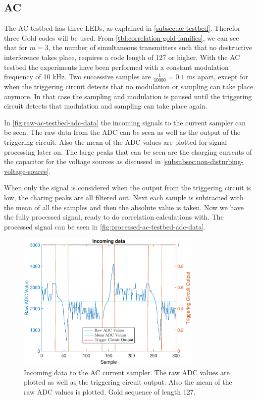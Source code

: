 
\subsection{AC}


The AC testbed has three LEDs, as explained in \autoref{subsec:ac-testbed}.
Therefor three Gold codes will be used.
From \autoref{tbl:correlation-gold-families}, we can see that for $m = 3$, the number of simultaneous transmitters such that no destructive interference takes place, requires a code length of 127 or higher.
With the AC testbed the experiments have been performed with a constant modulation frequency of 10 kHz.
Two successive samples are $\frac{1}{10000} = 0.1$ ms apart, except for when the triggering circuit detects that no modulation or sampling can take place anymore.
In that case the sampling and modulation is paused until the triggering circuit detects that modulation and sampling can take place again.


In \autoref{fig:raw-ac-testbed-adc-data} the incoming signals to the current sampler can be seen.
The raw data from the ADC can be seen as well as the output of the triggering circuit.
Also the mean of the ADC values are plotted for signal processing later on.
The large peaks that can be seen are the charging currents of the capacitor for the voltage sources as discussed in \autoref{subsubsec:non-disturbing-voltage-source}.

When only the signal is considered when the output from the triggering circuit is low, the charing peaks are all filtered out.
Next each sample is subtracted with the mean of all the samples and then the absolute value is taken.
Now we have the fully processed signal, ready to do correlation calculations with.
The processed signal can be seen in \autoref{fig:processed-ac-testbed-adc-data}.



\begin{figure}
  \centering
  \includegraphics[width=0.8\textwidth]{chapters/evaluation-chapters/hardware/ac/raw-ac-testbed-adc-data.eps}
    \caption{Incoming data to the AC current sampler. The raw ADC values are plotted as well as the triggering circuit output. Also the mean of the raw ADC values is plotted. Gold sequence of length 127.}
  \label{fig:raw-ac-testbed-adc-data}
\end{figure}


